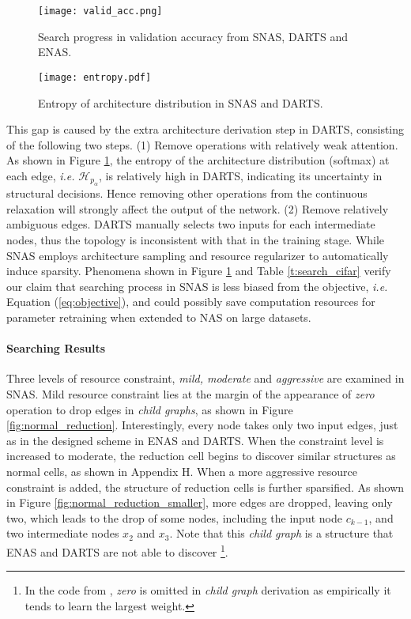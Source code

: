 \documentclass{article} \usepackage{iclr2019_conference,times}
\newcommand{\zh}{\color{black}}
\begin{document}
\begin{figure}[h]
  \centering
  \begin{minipage}[t]{0.55\textwidth}
  \centering
  \texttt{[image: valid\_acc.png]}
  \caption{Search progress in validation accuracy from SNAS, DARTS and ENAS.}
  \label{fig:valid_acc}
  \end{minipage}
  \hfill
  \begin{minipage}[t]{0.4\textwidth}
  \centering
  \texttt{[image: entropy.pdf]}
  \caption{Entropy of architecture distribution in SNAS and DARTS.}
  \label{fig:entropy}
  \end{minipage}
\end{figure}

This gap is caused by the extra architecture derivation step in DARTS, consisting of the following two steps. (1) Remove operations with relatively weak attention. As shown in Figure \ref{fig:entropy}, the entropy of the architecture distribution (softmax) at each edge, \textit{i.e.} $\mathcal{H}_{p_{\alpha}}$, is relatively high in DARTS, indicating its uncertainty in structural decisions. Hence removing other operations from the continuous relaxation will strongly affect the output of the network. (2) Remove relatively ambiguous edges. DARTS manually selects two inputs for each intermediate nodes, thus the topology is inconsistent with that in the training stage. While SNAS employs architecture sampling and resource regularizer to automatically induce sparsity. Phenomena shown in Figure \ref{fig:entropy} and Table \ref{t:search_cifar} verify our claim that searching process in SNAS is less biased from the objective, \textit{i.e.} Equation (\ref{eq:objective}), and could possibly save computation resources for parameter retraining when extended to NAS on large datasets.

\paragraph{Searching Results}

Three levels of resource constraint, \textit{mild, moderate} and \textit{aggressive} are {\zh examined} in SNAS. Mild resource constraint lies at the margin of the {\zh appearance} of \textit{zero} operation to drop edges in \textit{child graphs}, as shown in Figure \ref{fig:normal_reduction}. Interestingly, every node takes only two input edges, just as in the designed scheme in ENAS and DARTS. When the constraint level is increased to moderate, the reduction cell begins to discover similar structures as normal cells, as shown in Appendix H. When a more aggressive resource constraint is added, the structure of reduction cells is further sparsified. As shown in Figure \ref{fig:normal_reduction_smaller}, more edges are dropped, leaving only two, which leads to the drop of some nodes, including the input node $c_{k-1}$, and two intermediate nodes $x_{2}$ and $x_{3}$. Note that this \textit{child graph} is a structure that ENAS and DARTS are not able to discover \footnote{In the code from \citet{liu2018darts}, \textit{zero} is omitted in \textit{child graph} derivation as empirically it tends to learn the largest weight.}.
\end{document}
